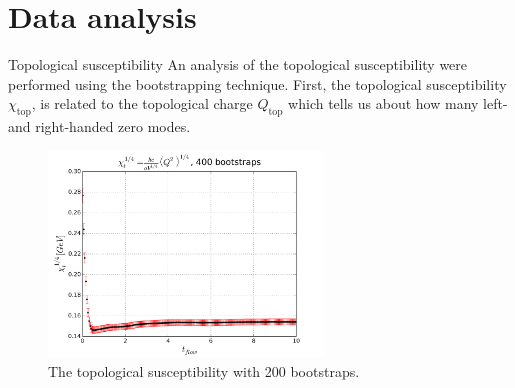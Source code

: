 \documentclass[10pt]{beamer}
\begin{document}
\section{Data analysis}
\begin{frame}{Topological susceptibility}
An analysis of the topological susceptibility were performed using the bootstrapping technique. First, the topological susceptibility $\chi_\text{top}$, is related to the topological charge $Q_\text{top}$ which tells us about how many left- and right-handed zero modes.
\begin{figure}
\includegraphics[width=0.65\textwidth]{chi_400bootstraps.png}
\caption{The topological susceptibility with 200 bootstraps.	}
\end{figure}
\end{frame}
\end{document}
